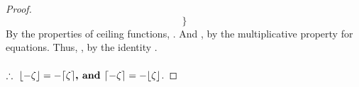 \documentclass[preview]{standalone}
\begin{document}
\begin{proof}
\begin{equation*}
        \Bigg\}
    \end{equation*}
    By the properties of ceiling functions,
    \bm{$\lceil - \zeta \rceil = - \lambda$}. 
    And  
    \bm{$- 1 \times \lfloor \zeta \rfloor = - \lambda$}, 
    by the multiplicative property for equations.
    Thus,
    \bm{$\lceil - \zeta \rceil = - \lfloor \zeta \rfloor$},
    by the identity \bm{$- \lambda$}.
    \\ \\
    $\therefore \text{\space}
    \relax{
            \lfloor - \zeta \rfloor 
                = 
            - \lceil \zeta \rceil
                \textbf{, and }
            \lceil - \zeta \rceil
                = 
            - \lfloor \zeta \rfloor
    }$.
\color{lightgray} \end{proof}
\end{document}
